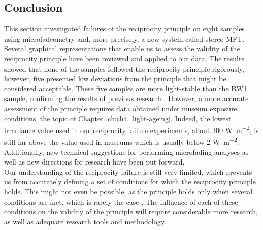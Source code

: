 \subsection{Conclusion}

This section investigated failures of the reciprocity principle on eight samples using microfadeometry and, more precisely, a new system called stereo-MFT. Several graphical representations that enable us to assess the validity of the reciprocity principle have been reviewed and applied to our data. The results showed that none of the samples followed the reciprocity principle rigorously, however, five presented low deviations from the principle that might be considered acceptable. These five samples are more light-stable than the BW1 sample, confirming the results of previous research \citep{del_hoyo-melendez_investigation_2011}. However, a more accurate assessment of the principle requires data obtained under museum exposure conditions, the topic of Chapter \ref{ch:ch4_light-ageing}. Indeed, the lowest irradiance value used in our reciprocity failure experiments, \ie about 300 \unit{\watt\per\square\metre}, is still far above the value used in museums which is usually below 2 \unit{\watt\per\square\metre}. Additionally, new technical suggestions for performing microfading analyses as well as new directions for research have been put forward. \\

Our understanding of the reciprocity failure is still very limited, which prevents us from accurately defining a set of conditions for which the reciprocity principle holds. This might not even be possible, as the principle holds only when several conditions are met, which is rarely the case \citep[506]{lojewski_spectroscopy_2019}. The influence of each of these conditions on the validity of the principle will require considerable more research, as well as adequate research tools and methodology.
